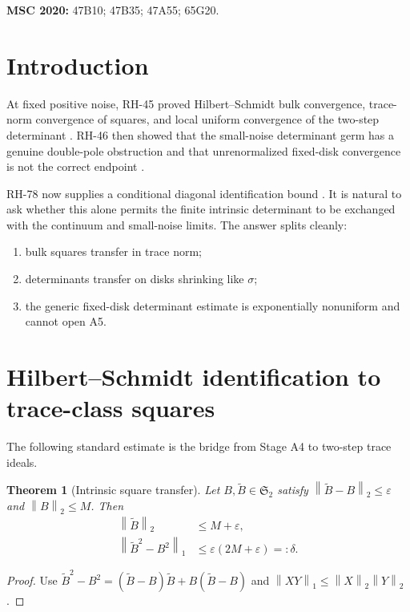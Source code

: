 \documentclass[11pt]{article}
\newtheorem{theorem}{Theorem}[section]
\newcommand{\norm}[1]{\left\lVert#1\right\rVert}
\begin{document}
\medskip
\noindent\textbf{MSC 2020:} 47B10; 47B35; 47A55; 65G20.

\section{Introduction}

At fixed positive noise, RH-45 proved Hilbert--Schmidt bulk convergence,
trace-norm convergence of squares, and local uniform convergence of the
two-step determinant \citep{WangTrace2026}.  RH-46 then showed that the
small-noise determinant germ has a genuine double-pole obstruction and that
unrenormalized fixed-disk convergence is not the correct endpoint
\citep{WangDoublePole2026}.

RH-78 now supplies a conditional diagonal identification bound
\citep{WangComposition2026}.  It is natural to ask whether this alone permits
the finite intrinsic determinant to be exchanged with the continuum and
small-noise limits.  The answer splits cleanly:
\begin{enumerate}[leftmargin=2.2em]
 \item bulk squares transfer in trace norm;
 \item determinants transfer on disks shrinking like $\sigma$;
 \item the generic fixed-disk determinant estimate is exponentially
       nonuniform and cannot open A5.
\end{enumerate}

\section{Hilbert--Schmidt identification to trace-class squares}

The following standard estimate is the bridge from Stage A4 to two-step
trace ideals.

\begin{theorem}[Intrinsic square transfer]
\label{thm:square}
Let $B,\widetilde B\in\mathfrak S_2$ satisfy
$\norm{\widetilde B-B}_2\le\varepsilon$ and $\norm B_2\le M$.  Then
\begin{align}
 \norm{\widetilde B}_2&\le M+\varepsilon,\label{eq:size}\\
 \norm{\widetilde B^2-B^2}_1
 &\le\varepsilon(2M+\varepsilon)=:\delta.
 \label{eq:square-error}
\end{align}
\end{theorem}

\begin{proof}
Use
$\widetilde B^2-B^2=(\widetilde B-B)\widetilde B+B(\widetilde B-B)$ and
$\norm{XY}_1\le\norm X_2\norm Y_2$.
\end{proof}
\end{document}
